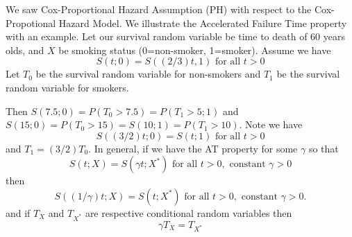 \documentclass{article}
\begin{document}
 We saw Cox-Proportional Hazard Assumption (PH) with respect to the Cox-Propotional Hazard Model.
 We illustrate the Accelerated Failure Time property with an example. Let our survival random variable be time to death of 60 years olds, and $X$ be smoking status (0=non-smoker, 1=smoker).
Assume we have
\[
S(t;0) = S((2/3)t,1) \text{ for all } t>0
\]
Let $T_0$ be the survival random variable for non-smokers and $T_1$ be the survival random variable for smokers.

Then $S(7.5;0) = P(T_0>7.5) = P(T_1>5;1)$ and $S(15;0) = P(T_0>15) = S(10;1) = P(T_1>10)$.
Note we have
\[
S((3/2)t;0) = S(t;1) \text{ for all } t>0
\]
and $T_1=(3/2)T_0$.
 In general, if we have the AT property for some $\gamma$ so that
\[ S(t;X) =  S(\gamma t;X^*)  \text{ for all } t>0, \text{ constant } \gamma > 0
\]
then
 \[ S((1/\gamma)t;X) =  S( t;X^*)  \text{ for all } t>0, \text{ constant } \gamma > 0.
\]
and if $T_X$ and $T_{X^*}$ are respective conditional random variables then
\[
\gamma T_X = T_{X^*}
\]
\end{document}
